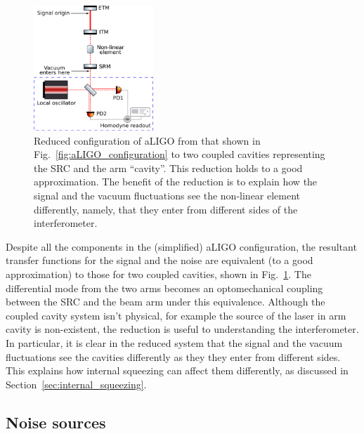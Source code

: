 \documentclass[aps,pra,superscriptaddress,reprint,nofootinbib]{revtex4-1}
\begin{document}
\begin{figure}[ht]
	\begin{center}
	\includegraphics[width=0.4\textwidth]{figures/aLIGO_as_coupled_cavities.pdf}
	\end{center}
	\caption{Reduced configuration of aLIGO from that shown in Fig.~\ref{fig:aLIGO_configuration} to two coupled cavities representing the SRC and the arm “cavity”. This reduction holds to a good approximation. The benefit of the reduction is to explain how the signal and the vacuum fluctuations see the non-linear element differently, namely, that they enter from different sides of the interferometer.}
	\label{fig:aLIGO_as_coupled_cavities}
\end{figure}

Despite all the components in the (simplified) aLIGO configuration, the resultant transfer functions for the signal and the noise are equivalent (to a good approximation) to those for two coupled cavities, shown in Fig.~\ref{fig:aLIGO_as_coupled_cavities}. The differential mode from the two arms becomes an optomechanical coupling between the SRC and the beam arm under this equivalence.
Although the coupled cavity system isn’t physical, for example the source of the laser in arm cavity is non-existent, the reduction is useful to understanding the interferometer. In particular, it is clear in the reduced system that the signal and the vacuum fluctuations see the cavities differently as they they enter from different sides. This explains how internal squeezing can affect them differently, as discussed in Section~\ref{sec:internal_squeezing}.


\subsection{Noise sources}
\label{sec:noise_sources}
\end{document}
